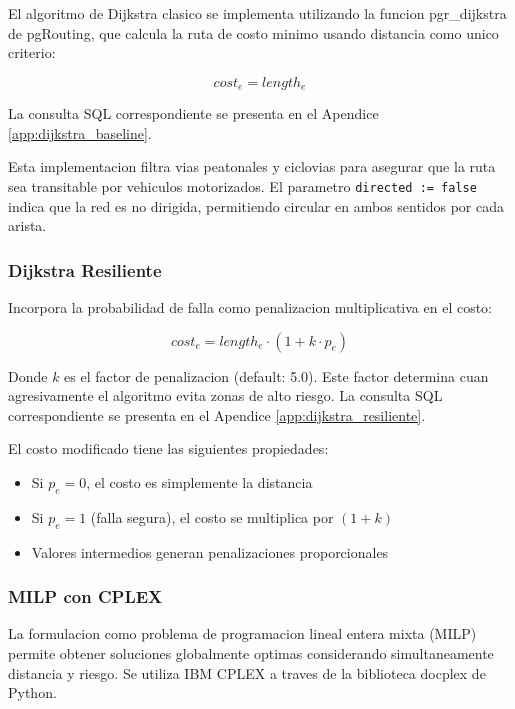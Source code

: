 \documentclass[conference]{IEEEtran}
\begin{document}
El algoritmo de Dijkstra clasico se implementa utilizando la funcion pgr\_dijkstra de pgRouting, que calcula la ruta de costo minimo usando distancia como unico criterio:

\begin{equation}
cost_e = length_e
\end{equation}

La consulta SQL correspondiente se presenta en el Apendice \ref{app:dijkstra_baseline}.

Esta implementacion filtra vias peatonales y ciclovias para asegurar que la ruta sea transitable por vehiculos motorizados. El parametro \texttt{directed := false} indica que la red es no dirigida, permitiendo circular en ambos sentidos por cada arista.

\subsubsection{Dijkstra Resiliente}

Incorpora la probabilidad de falla como penalizacion multiplicativa en el costo:

\begin{equation}
cost_e = length_e \cdot (1 + k \cdot p_e)
\end{equation}

Donde $k$ es el factor de penalizacion (default: 5.0). Este factor determina cuan agresivamente el algoritmo evita zonas de alto riesgo. La consulta SQL correspondiente se presenta en el Apendice \ref{app:dijkstra_resiliente}.

El costo modificado tiene las siguientes propiedades:
\begin{itemize}
    \item Si $p_e = 0$, el costo es simplemente la distancia
    \item Si $p_e = 1$ (falla segura), el costo se multiplica por $(1 + k)$
    \item Valores intermedios generan penalizaciones proporcionales
\end{itemize}

\subsubsection{MILP con CPLEX}

La formulacion como problema de programacion lineal entera mixta (MILP) permite obtener soluciones globalmente optimas considerando simultaneamente distancia y riesgo. Se utiliza IBM CPLEX a traves de la biblioteca docplex de Python.
\end{document}
